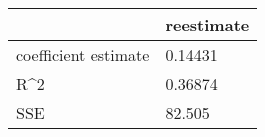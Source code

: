 \begin{tabular}{ll}
& reestimate \\ 
\hline 
coefficient estimate & 0.14431 \\ 
R\^{}2 & 0.36874 \\ 
SSE & 82.505 \\ 
\hline 
\end{tabular}
